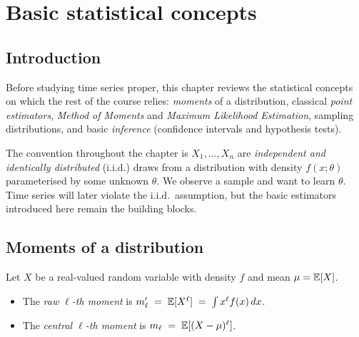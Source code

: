 %

\chapter{Basic statistical concepts}
\label{ch:basic-stats}

\section*{Introduction}

Before studying time series proper, this chapter reviews the
statistical concepts on which the rest of the course relies:
\emph{moments} of a distribution, classical \emph{point estimators},
\emph{Method of Moments} and \emph{Maximum Likelihood Estimation},
sampling distributions, and basic \emph{inference} (confidence
intervals and hypothesis tests).

\medskip
The convention throughout the chapter is $X_1, \dots, X_n$ are
\emph{independent and identically distributed} (i.i.d.) draws from a
distribution with density $f(x;\theta)$ parameterised by some unknown
$\theta$. We observe a sample and want to learn $\theta$. Time series
will later violate the i.i.d.\ assumption, but the basic estimators
introduced here remain the building blocks.

\section{Moments of a distribution}
\label{sec:moments}

\begin{defbox}
\label{def:moments}
Let $X$ be a real-valued random variable with density $f$ and mean
$\mu = \mathbb{E}[X]$.
\begin{itemize}
  \item The \emph{raw $\ell$-th moment} is
        $m'_\ell \;=\; \mathbb{E}[X^\ell] \;=\; \int x^\ell f(x)\, dx$.
  \item The \emph{central $\ell$-th moment} is
        $m_\ell \;=\; \mathbb{E}[(X - \mu)^\ell]$.
\end{itemize}
\end{defbox}

